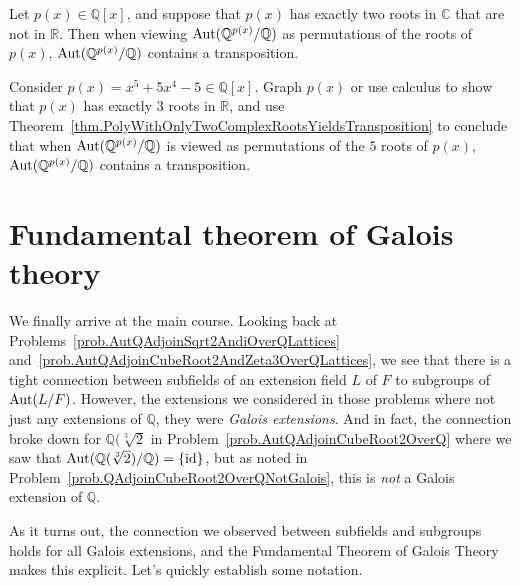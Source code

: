 \begin{theorem}\label{thm.PolyWithOnlyTwoComplexRootsYieldsTransposition}
Let $p(x) \in \mathbb{Q}[x]$, and suppose that $p(x)$ has exactly two roots in $\mathbb{C}$ that are not in $\mathbb{R}$. Then when viewing $\operatorname{Aut}(\mathbb{Q}^{p(x)}/\mathbb{Q})$ as permutations of the roots of $p(x)$, $\operatorname{Aut}(\mathbb{Q}^{p(x)}/\mathbb{Q})$ contains a transposition.
\end{theorem}

\begin{problem}\label{prob.AutSplittingFieldx55x45ContainsTransposition}
Consider $p(x) = x^5 +5x^4-5 \in \mathbb{Q}[x]$. Graph $p(x)$ or use calculus to show that $p(x)$ has exactly $3$ roots  in $\mathbb{R}$, and use Theorem~\ref{thm.PolyWithOnlyTwoComplexRootsYieldsTransposition} to conclude that when $\operatorname{Aut}(\mathbb{Q}^{p(x)}/\mathbb{Q})$ is viewed as permutations of the $5$ roots of $p(x)$, $\operatorname{Aut}(\mathbb{Q}^{p(x)}/\mathbb{Q})$ contains a transposition.
\end{problem}

\section{Fundamental theorem of Galois theory}

We finally arrive at the main course. Looking back at Problems~\ref{prob.AutQAdjoinSqrt2AndiOverQLattices} and~\ref{prob.AutQAdjoinCubeRoot2AndZeta3OverQLattices}, we see that there is a tight connection between subfields of an extension  field $L$ of $F$ to subgroups of $\operatorname{Aut}(L/F)$. However, the extensions we considered in those problems where not just any extensions of $\mathbb{Q}$, they were \emph{Galois extensions}. And in fact, the connection broke down for $\mathbb{Q}(\sqrt[3]{2}$ in Problem~\ref{prob.AutQAdjoinCubeRoot2OverQ} where we saw that $\operatorname{Aut}(\mathbb{Q}(\sqrt[3]{2})/\mathbb{Q}) = \{\text{id}\}$, but as noted in  Problem~\ref{prob.QAdjoinCubeRoot2OverQNotGalois}, this is \emph{not} a Galois extension of $\mathbb{Q}$. 

As it turns out, the connection we observed between subfields and subgroups holds for all Galois extensions, and the Fundamental Theorem of Galois Theory makes this explicit. Let's quickly establish some notation.

